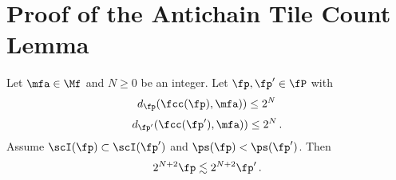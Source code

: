 \section{Proof of the Antichain Tile Count Lemma}
\label{subsec-geolem}


\begin{lemma}\label{tile-reach}
\leanok
{}
Let $\mfa\in \Mf$ and $N\ge0$ be an integer.
Let $\fp, \fp'\in \fP$ with
\begin{equation}\label{eqassumedismfa}
    d_{\fp}(\fcc(\fp), \mfa))\le 2^N\,
\end{equation}
\begin{equation}\label{eqassumedismfap}
    d_{\fp'}(\fcc(\fp'), \mfa))\le 2^N\, .
\end{equation}
Assume $\scI(\fp)\subset \scI(\fp')$ and $\ps(\fp)<\ps(\fp')$.
Then
\begin{equation}\label{lp'lp''}2^{N+2}\fp\lesssim 2^{N+2} \fp'\, .
\end{equation}
\end{lemma}

